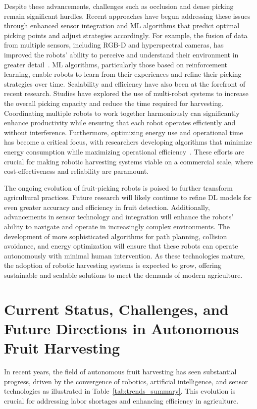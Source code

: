 \documentclass[a4paper,fleqn]{cas-dc}
\begin{document}
Despite these advancements, challenges such as occlusion and dense picking remain significant hurdles. Recent approaches have begun addressing these issues through enhanced sensor integration and ML algorithms that predict optimal picking points and adjust strategies accordingly. For example, the fusion of data from multiple sensors, including RGB-D and hyperspectral cameras, has improved the robots' ability to perceive and understand their environment in greater detail~\cite{gene2019fruit, pourdarbani2020automatic}. ML algorithms, particularly those based on reinforcement learning, enable robots to learn from their experiences and refine their picking strategies over time.
Scalability and efficiency have also been at the forefront of recent research. Studies have explored the use of multi-robot systems to increase the overall picking capacity and reduce the time required for harvesting. Coordinating multiple robots to work together harmoniously can significantly enhance productivity while ensuring that each robot operates efficiently and without interference. Furthermore, optimizing energy use and operational time has become a critical focus, with researchers developing algorithms that minimize energy consumption while maximizing operational efficiency~\cite{rayhana2020internet, martos2021ensuring}. These efforts are crucial for making robotic harvesting systems viable on a commercial scale, where cost-effectiveness and reliability are paramount.

The ongoing evolution of fruit-picking robots is poised to further transform agricultural practices. Future research will likely continue to refine DL models for even greater accuracy and efficiency in fruit detection. Additionally, advancements in sensor technology and integration will enhance the robots' ability to navigate and operate in increasingly complex environments. The development of more sophisticated algorithms for path planning, collision avoidance, and energy optimization will ensure that these robots can operate autonomously with minimal human intervention. As these technologies mature, the adoption of robotic harvesting systems is expected to grow, offering sustainable and scalable solutions to meet the demands of modern agriculture.
\fi

\section{Current Status, Challenges, and Future Directions in Autonomous Fruit Harvesting}
In recent years, the field of autonomous fruit harvesting has seen substantial progress, driven by the convergence of robotics, artificial intelligence, and sensor technologies as illustrated in Table~\ref{tab:trends_summary}. This evolution is crucial for addressing labor shortages and enhancing efficiency in agriculture.
\end{document}
